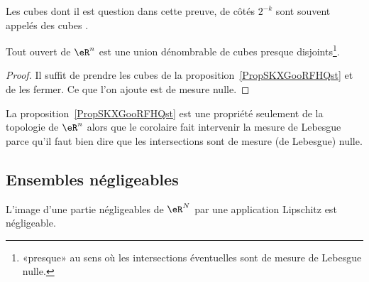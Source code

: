 Les cubes dont il est question dans cette preuve, de côtés \( 2^{-k}\) sont souvent appelés des cubes .

\begin{corollary}     \label{CorTHDQooWMSbJe}
    Tout ouvert de \( \eR^n\) est une union dénombrable de cubes presque disjoints\footnote{«presque» au sens où les intersections éventuelles sont de mesure de Lebesgue nulle.}.
\end{corollary}

\begin{proof}
    Il suffit de prendre les cubes de la proposition~\ref{PropSKXGooRFHQst} et de les fermer. Ce que l'on ajoute est de mesure nulle.
\end{proof}

\begin{remark}
    La proposition~\ref{PropSKXGooRFHQst} est une propriété seulement de la topologie de \( \eR^n\) alors que le corolaire fait intervenir la mesure de Lebesgue parce qu'il faut bien dire que les intersections sont de mesure (de Lebesgue) nulle.
\end{remark}

\subsection{Ensembles négligeables}

\begin{lemma}      \label{LemWHKJooGPuxEN}
    L'image d'une partie négligeables de \( \eR^N\) par une application Lipschitz est négligeable.
\end{lemma}


